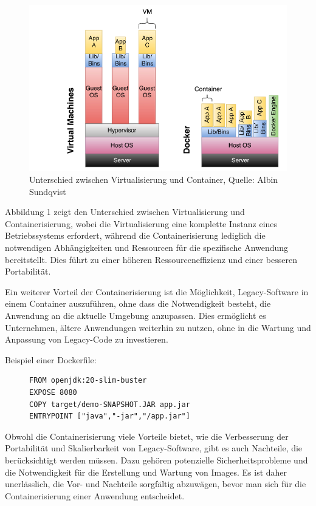 \begin{figure}[h]
	\includegraphics[width=\columnwidth]{gfx/vm vs container.png} %
	\caption{Unterschied zwischen Virtualisierung und Container, Quelle: Albin Sundqvist \cite{sundqvist2020guidelines}}
\end{figure}

Abbildung 1 zeigt den Unterschied zwischen Virtualisierung und Containerisierung, wobei die Virtualisierung eine komplette Instanz eines Betriebssystems erfordert, während die Containerisierung lediglich die notwendigen Abhängigkeiten und Ressourcen für die spezifische Anwendung bereitstellt. Dies führt zu einer höheren Ressourceneffizienz und einer besseren Portabilität.

Ein weiterer Vorteil der Containerisierung ist die Möglichkeit, Legacy-Software in einem Container auszuführen, ohne dass die Notwendigkeit besteht, die Anwendung an die aktuelle Umgebung anzupassen.
Dies ermöglicht es Unternehmen, ältere Anwendungen weiterhin zu nutzen, ohne in die Wartung und Anpassung von Legacy-Code zu investieren.

\begin{description}
	\item[Beispiel einer Dockerfile:]\leavevmode
	\begin{lstlisting}
FROM openjdk:20-slim-buster
EXPOSE 8080
COPY target/demo-SNAPSHOT.JAR app.jar
ENTRYPOINT ["java","-jar","/app.jar"]
\end{lstlisting}
\end{description}


Obwohl die Containerisierung viele Vorteile bietet, wie die Verbesserung der Portabilität und Skalierbarkeit von Legacy-Software, gibt es auch Nachteile, die berücksichtigt werden müssen. Dazu gehören potenzielle Sicherheitsprobleme und die Notwendigkeit für die Erstellung und Wartung von Images. Es ist daher unerlässlich, die Vor- und Nachteile sorgfältig abzuwägen, bevor man sich für die Containerisierung einer Anwendung entscheidet.

